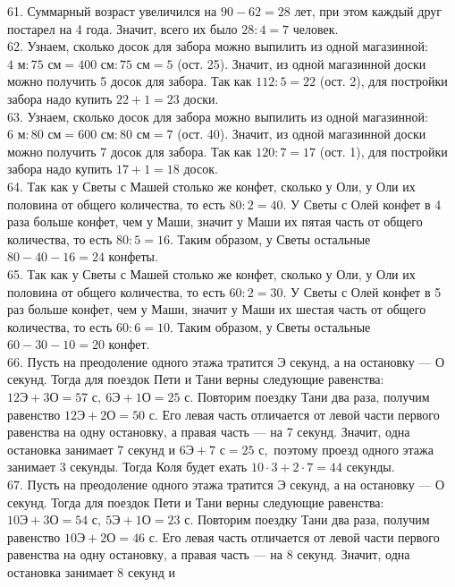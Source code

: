 \documentclass[12pt]{article}
\begin{document}
61. Суммарный возраст увеличился на $90-62=28$ лет, при этом каждый друг постарел на 4 года. Значит, всего их было $28:4=7$ человек.\\
62. Узнаем, сколько досок для забора можно выпилить из одной магазинной: $4\text{ м}:75\text{ см}=400\text{ см}:75\text{ см}=5$ (ост. 25). Значит, из одной магазинной доски можно получить 5 досок для забора. Так как $112:5=22$ (ост. 2), для постройки забора надо купить $22+1=23$ доски.\\
63. Узнаем, сколько досок для забора можно выпилить из одной магазинной: $6\text{ м}:80\text{ см}=600\text{ см}:80\text{ см}=7$ (ост. 40). Значит, из одной магазинной доски можно получить 7 досок для забора. Так как $120:7=17$ (ост. 1), для постройки забора надо купить $17+1=18$ досок.\\
64. Так как у Светы с Машей столько же конфет, сколько у Оли, у Оли их половина от общего количества, то есть $80:2=40.$ У Светы с Олей конфет в 4 раза больше конфет, чем у Маши, значит у Маши их пятая часть от общего количества, то есть $80:5=16.$ Таким образом, у Светы остальные $80-40-16=24$ конфеты.\\
65. Так как у Светы с Машей столько же конфет, сколько у Оли, у Оли их половина от общего количества, то есть $60:2=30.$ У Светы с Олей конфет в 5 раз больше конфет, чем у Маши, значит у Маши их шестая часть от общего количества, то есть $60:6=10.$ Таким образом, у Светы остальные $60-30-10=20$ конфет.\\
66. Пусть на преодоление одного этажа тратится Э секунд, а на остановку --- О секунд. Тогда для поездок Пети и Тани верны следующие равенства: $12\text{Э}+3\text{О}=57\text{ с},\ 6\text{Э}+1\text{О}=25\text{ с}.$ Повторим поездку Тани два раза, получим равенство $12\text{Э}+2\text{О}=50\text{ с}.$ Его левая часть отличается от левой части первого равенства на одну остановку, а правая часть --- на 7 секунд. Значит, одна остановка занимает 7 секунд и
$6\text{Э}+7\text{ с}=25\text{ с},$ поэтому проезд одного этажа занимает 3 секунды. Тогда Коля будет ехать $10\cdot3+2\cdot7=44$ секунды.\\
67. Пусть на преодоление одного этажа тратится Э секунд, а на остановку --- О секунд. Тогда для поездок Пети и Тани верны следующие равенства: $10\text{Э}+3\text{О}=54\text{ с},\ 5\text{Э}+1\text{О}=23\text{ с}.$ Повторим поездку Тани два раза, получим равенство $10\text{Э}+2\text{О}=46\text{ с}.$ Его левая часть отличается от левой части первого равенства на одну остановку, а правая часть --- на 8 секунд. Значит, одна остановка занимает 8 секунд и
\end{document}
